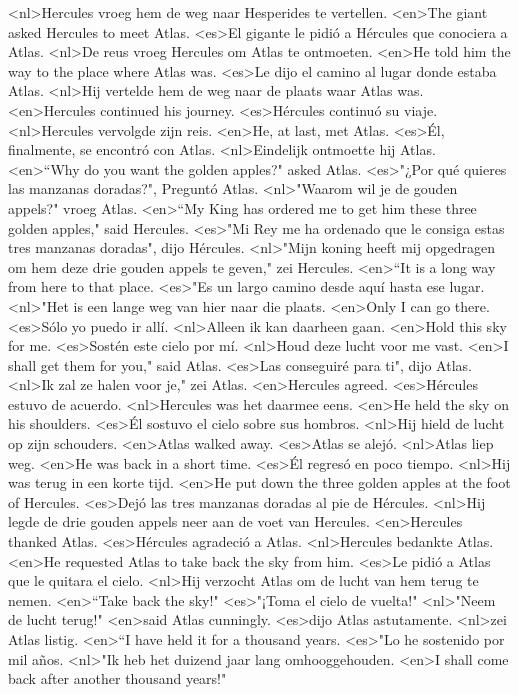 <nl>Hercules vroeg hem de weg naar Hesperides te vertellen.
<en>The giant asked Hercules to meet Atlas.
<es>El gigante le pidió a Hércules que conociera a Atlas.
<nl>De reus vroeg Hercules om Atlas te ontmoeten.
<en>He told him the way to the place where Atlas was.
<es>Le dijo el camino al lugar donde estaba Atlas.
<nl>Hij vertelde hem de weg naar de plaats waar Atlas was.
<en>Hercules continued his journey.
<es>Hércules continuó su viaje.
<nl>Hercules vervolgde zijn reis.
<en>He, at last, met Atlas.
<es>Él, finalmente, se encontró con Atlas.
<nl>Eindelijk ontmoette hij Atlas.
<en>“Why do you want the golden apples?" asked Atlas.
<es>"¿Por qué quieres las manzanas doradas?", Preguntó Atlas.
<nl>"Waarom wil je de gouden appels?" vroeg Atlas.
<en>“My King has ordered me to get him these three golden apples," said Hercules.
<es>"Mi Rey me ha ordenado que le consiga estas tres manzanas doradas", dijo Hércules.
<nl>"Mijn koning heeft mij opgedragen om hem deze drie gouden appels te geven," zei Hercules.
<en>“It is a long way from here to that place.
<es>"Es un largo camino desde aquí hasta ese lugar.
<nl>"Het is een lange weg van hier naar die plaats.
<en>Only I can go there.
<es>Sólo yo puedo ir allí.
<nl>Alleen ik kan daarheen gaan.
<en>Hold this sky for me.
<es>Sostén este cielo por mí.
<nl>Houd deze lucht voor me vast.
<en>I shall get them for you," said Atlas.
<es>Las conseguiré para ti", dijo Atlas.
<nl>Ik zal ze halen voor je," zei Atlas.
<en>Hercules agreed.
<es>Hércules estuvo de acuerdo.
<nl>Hercules was het daarmee eens.
<en>He held the sky on his shoulders.
<es>Él sostuvo el cielo sobre sus hombros.
<nl>Hij hield de lucht op zijn schouders.
<en>Atlas walked away.
<es>Atlas se alejó.
<nl>Atlas liep weg.
<en>He was back in a short time.
<es>Él regresó en poco tiempo.
<nl>Hij was terug in een korte tijd.
<en>He put down the three golden apples at the foot of Hercules.
<es>Dejó las tres manzanas doradas al pie de Hércules.
<nl>Hij legde de drie gouden appels neer aan de voet van Hercules.
<en>Hercules thanked Atlas.
<es>Hércules agradeció a Atlas.
<nl>Hercules bedankte Atlas.
<en>He requested Atlas to take back the sky from him.
<es>Le pidió a Atlas que le quitara el cielo.
<nl>Hij verzocht Atlas om de lucht van hem terug te nemen.
<en>“Take back the sky!"
<es>"¡Toma el cielo de vuelta!"
<nl>"Neem de lucht terug!"
<en>said Atlas cunningly.
<es>dijo Atlas astutamente.
<nl>zei Atlas listig.
<en>“I have held it for a thousand years.
<es>"Lo he sostenido por mil años.
<nl>"Ik heb het duizend jaar lang omhooggehouden.
<en>I shall come back after another thousand years!"
